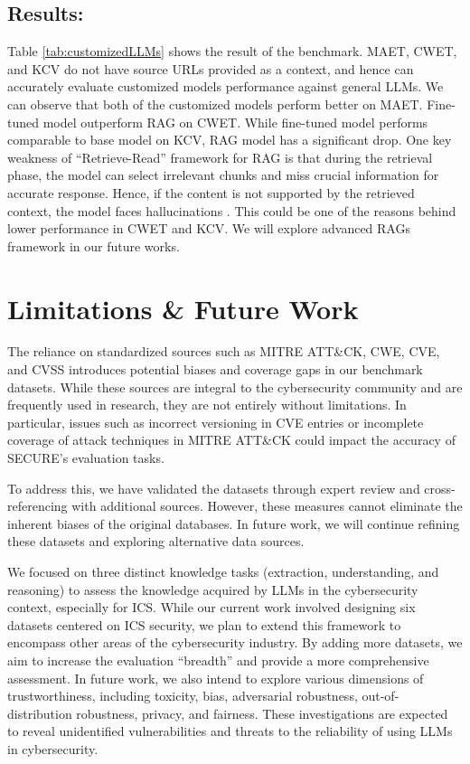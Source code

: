 \documentclass[conference]{IEEEtran}
\begin{document}
\subsection{Results:} Table \ref{tab:customizedLLMs} shows the result of the benchmark. MAET, CWET, and KCV do not have source URLs provided as a context, and hence can accurately evaluate customized models performance against general LLMs. We can observe that both of the customized models perform better on MAET. Fine-tuned model outperform RAG on CWET. While fine-tuned model performs comparable to base model on KCV, RAG model has a significant drop. One key weakness of “Retrieve-Read” framework for RAG is that during the retrieval phase, the model can select irrelevant chunks and miss crucial information for accurate response. Hence, if the content is not supported by the retrieved context, the model faces hallucinations \cite{gao2023retrieval}. This could be one of the reasons behind lower performance in CWET and KCV. We will explore advanced RAGs framework in our future works. 


\section{Limitations \& Future Work}\label{sec:limitations}

The reliance on standardized sources such as MITRE ATT\&CK, CWE, CVE, and CVSS introduces potential biases and coverage gaps in our benchmark datasets. While these sources are integral to the cybersecurity community and are frequently used in research, they are not entirely without limitations. In particular, issues such as incorrect versioning in CVE entries or incomplete coverage of attack techniques in MITRE ATT\&CK could impact the accuracy of SECURE's evaluation tasks.

To address this, we have validated the datasets through expert review and cross-referencing with additional sources. However, these measures cannot eliminate the inherent biases of the original databases. In future work, we will continue refining these datasets and exploring alternative data sources.

We focused on three distinct knowledge tasks (extraction, understanding, and reasoning) to assess the knowledge acquired by LLMs in the cybersecurity context, especially for ICS. While our current work involved designing six datasets centered on ICS security, we plan to extend this framework to encompass other areas of the cybersecurity industry. By adding more datasets, we aim to increase the evaluation ``breadth'' and provide a more comprehensive assessment. In future work, we also intend to explore various dimensions of trustworthiness, including toxicity, bias, adversarial robustness, out-of-distribution robustness, privacy, and fairness. These investigations are expected to reveal unidentified vulnerabilities and threats to the reliability of using LLMs in cybersecurity. 
\end{document}
